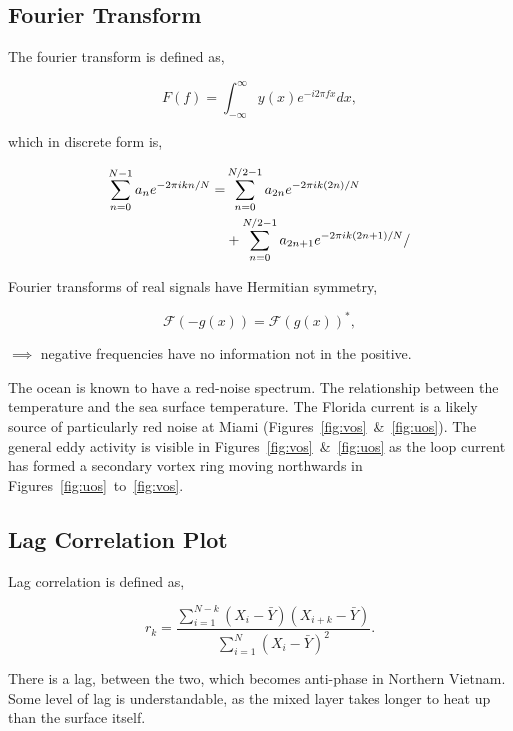 \subsection{Fourier Transform}
\label{sec:fourier}

The fourier transform is defined as,

\begin{equation}
F(f)=\int_{-\infty}^{\infty} y(x) e^{-i 2\pi f x} d x,
\end{equation}

which in discrete form is,


\begin{eqnarray}
\sum_{n=0}^{N-1} a_{n} e^{-2 \pi i  k n/ N}=&\sum_{n=0}^{N / 2-1} a_{2 n}
e^{-2 \pi i k (2 n)/ N}  \\ &+\sum_{n=0}^{N / 2-1} a_{2n+1} e^{-2 \pi i k (2 n+1)/ N}/ \notag
\end{eqnarray}

Fourier transforms of real signals have Hermitian symmetry,

\begin{equation}
\mathcal{F}{(-g(x))}=\mathcal{F}(g(x))^{*},
\end{equation}

$\implies$ negative frequencies have no information not in the positive.


The ocean is known to have a red-noise spectrum.
The relationship between the temperature and the sea surface temperature.
The Florida current is a likely source of particularly red noise at Miami
(Figures~\ref{fig:vos}~\&~\ref{fig:uos}).
The general eddy activity is visible in Figures~\ref{fig:vos}~\&~\ref{fig:uos}
as the loop current has formed a secondary vortex ring moving northwards
in Figures~\ref{fig:uos}~to~\ref{fig:vos}.










\subsection{Lag Correlation Plot}
\label{sec:lag}



Lag correlation is defined as,

\begin{equation}
r_{k}=
\frac{\sum_{i=1}^{N-k}\left(X_{i}
-\bar{Y}\right)\left(X_{i+k}-\bar{Y}\right)}
{\sum_{i=1}^{N}\left(X_{i}
-\bar{Y}\right)^{2}}.
\end{equation}

There is a lag, between the two,
which becomes anti-phase in
Northern Vietnam.
Some level of lag is understandable,
as the mixed layer takes longer
to heat up than the surface itself.

\FloatBarrier
